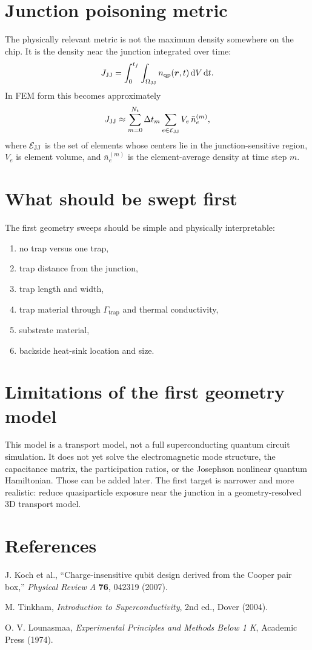 \documentclass[11pt]{article}
\begin{document}
\section{Junction poisoning metric}
The physically relevant metric is not the maximum density somewhere on the chip. It is the density near the junction integrated over time:
\begin{equation}
J_{\mathrm{JJ}}=\int_0^{t_f}\int_{\Omega_{\mathrm{JJ}}}n_{\mathrm{qp}}(\bm{r},t)\,\dd V\,\dd t.
\end{equation}
In FEM form this becomes approximately
\begin{equation}
J_{\mathrm{JJ}}\approx\sum_{m=0}^{N_t}\Delta t_m\sum_{e\in\mathcal{E}_{\mathrm{JJ}}}V_e\,\bar{n}_{e}^{(m)},
\end{equation}
where $\mathcal{E}_{\mathrm{JJ}}$ is the set of elements whose centers lie in the junction-sensitive region, $V_e$ is element volume, and $\bar{n}_e^{(m)}$ is the element-average density at time step $m$.

\section{What should be swept first}
The first geometry sweeps should be simple and physically interpretable:
\begin{enumerate}[leftmargin=1.6em]
    \item no trap versus one trap,
    \item trap distance from the junction,
    \item trap length and width,
    \item trap material through $\Gamma_{\mathrm{trap}}$ and thermal conductivity,
    \item substrate material,
    \item backside heat-sink location and size.
\end{enumerate}

\section{Limitations of the first geometry model}
This model is a transport model, not a full superconducting quantum circuit simulation. It does not yet solve the electromagnetic mode structure, the capacitance matrix, the participation ratios, or the Josephson nonlinear quantum Hamiltonian. Those can be added later. The first target is narrower and more realistic: reduce quasiparticle exposure near the junction in a geometry-resolved 3D transport model.

\section{References}
\begin{enumerate}[label={[\arabic*]}]
\item J. Koch et al., ``Charge-insensitive qubit design derived from the Cooper pair box,'' \emph{Physical Review A} \textbf{76}, 042319 (2007).
\item M. Tinkham, \emph{Introduction to Superconductivity}, 2nd ed., Dover (2004).
\item O. V. Lounasmaa, \emph{Experimental Principles and Methods Below 1 K}, Academic Press (1974).
\end{enumerate}
\end{document}
